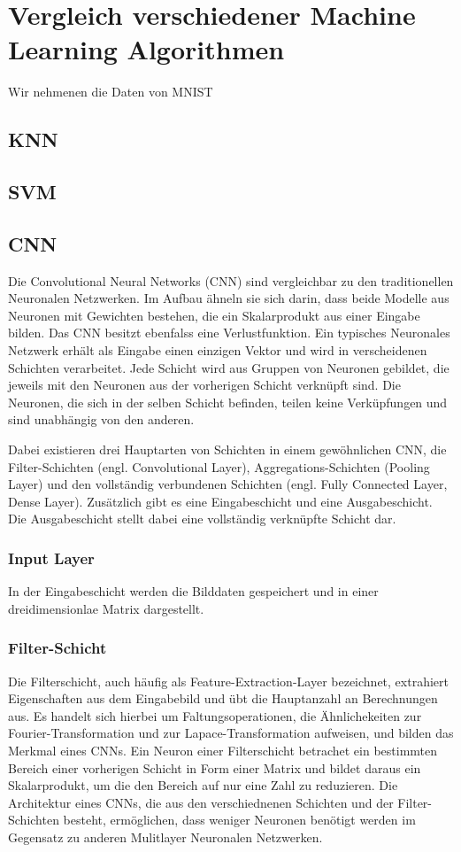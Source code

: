 \section{Vergleich verschiedener Machine Learning Algorithmen}
Wir nehmenen die Daten von MNIST
\subsection{KNN}

\subsection{SVM}

\subsection{CNN}
Die Convolutional Neural Networks (CNN) sind vergleichbar zu den traditionellen Neuronalen
Netzwerken. Im Aufbau ähneln sie sich darin, dass beide Modelle aus Neuronen mit Gewichten 
bestehen, die ein Skalarprodukt aus einer Eingabe bilden. Das CNN besitzt ebenfalss eine
Verlustfunktion. Ein typisches Neuronales Netzwerk erhält als Eingabe einen einzigen Vektor und
wird in verscheidenen Schichten verarbeitet. 
Jede Schicht wird aus Gruppen von Neuronen gebildet, die jeweils mit den Neuronen aus der vorherigen
Schicht verknüpft sind. Die Neuronen, die sich in der selben Schicht befinden, teilen keine Verküpfungen und sind
unabhängig von den anderen.

Dabei existieren drei Hauptarten von Schichten in einem gewöhnlichen CNN, die Filter-Schichten (engl. Convolutional Layer), Aggregations-Schichten (Pooling Layer) 
und den vollständig verbundenen Schichten (engl. Fully Connected Layer, Dense Layer). 
Zusätzlich gibt es eine Eingabeschicht und eine Ausgabeschicht. Die Ausgabeschicht stellt dabei eine vollständig verknüpfte Schicht dar.

\subsubsection{Input Layer}
In der Eingabeschicht werden die Bilddaten gespeichert und in einer dreidimensionlae Matrix dargestellt.

\subsubsection{Filter-Schicht}
Die Filterschicht, auch häufig als Feature-Extraction-Layer bezeichnet, extrahiert Eigenschaften aus dem Eingabebild und übt die Hauptanzahl an Berechnungen aus. 
Es handelt sich hierbei um Faltungsoperationen, die Ähnlichekeiten zur Fourier-Transformation und zur Lapace-Transformation aufweisen, und bilden das Merkmal eines CNNs.
Ein Neuron einer Filterschicht betrachet ein bestimmten Bereich einer vorherigen Schicht in Form einer Matrix und bildet daraus ein Skalarprodukt, um die den Bereich auf nur eine Zahl zu reduzieren.
Die Architektur eines CNNs, die aus den verschiednenen Schichten und der Filter-Schichten besteht, ermöglichen, dass weniger Neuronen benötigt werden im Gegensatz zu anderen Mulitlayer Neuronalen Netzwerken.

